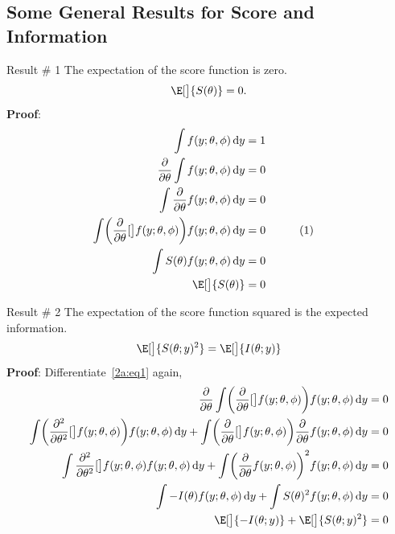 \documentclass[oneside]{book}\usepackage[]{graphicx}\usepackage[svgnames]{xcolor}
\let\log\relax%
\begin{document}
\subsection*{Some General Results for Score and Information}
\begin{Result}{Result \# 1}
      The expectation of the score function is zero.
      \[ \E[\big]{S(\theta)}=0. \]
      \tcblower{}
      \textbf{Proof}:
      \begin{align*}
            \int f(y;\theta,\phi)\odif{y}                                                         & =1                               \\
            \pdv*{\int f(y;\theta,\phi)\odif{y}}{\theta}                                          & =0                               \\
            \int\pdv*{f(y;\theta,\phi)}{\theta} \odif{y}                                          & =0                               \\
            \int\biggl(\pdv*{\log[\big]{f(y;\theta,\phi)}}{\theta}\biggr)f(y;\theta,\phi)\odif{y} & =0 &  & \label{2a:eq1}\tag*{(1)} \\
            \int S(\theta)f(y;\theta,\phi)\odif{y}                                                & =0                               \\
            \E[\big]{S(\theta)}                                                                   & =0
      \end{align*}
\end{Result}
\begin{Result}{Result \# 2}
      The expectation of the score function squared is the expected information.
      \[  \E[\big]{S(\theta;y)^2}=\E[\big]{I(\theta;y)} \]
      \tcblower{}
      \textbf{Proof}: Differentiate~\ref{2a:eq1} again,
      \begin{align*}
            \pdv*{\int\biggl(\pdv*{\log[\big]{f(y;\theta,\phi)}}{\theta}\biggr)f(y;\theta,\phi)\odif{y}}{\theta}                                                                                                 & =0 \\
            \int \biggl(\pdv*[order=2]{\log[\big]{f(y;\theta,\phi)}}{\theta}\biggr)f(y;\theta,\phi)\odif{y}+\int\biggl(\pdv*{\log[\big]{f(y;\theta,\phi)}}{\theta}\biggr)\pdv*{f(y;\theta,\phi)}{\theta}\odif{y} & =0 \\
            \int \pdv*[order=2]{\log[\big]{f(y;\theta,\phi)}}{\theta}f(y;\theta,\phi)\odif{y}+\int\biggl(\pdv*{f(y;\theta,\phi)}{\theta}\biggr)^2 f(y;\theta,\phi)\odif{y}                                       & =0 \\
            \int -I(\theta)f(y;\theta,\phi)\odif{y}+\int S(\theta)^2 f(y;\theta,\phi)\odif{y}                                                                                                                    & =0 \\
            \E[\big]{-I(\theta;y)}+\E[\big]{S(\theta;y)^2}                                                                                                                                                       & =0
      \end{align*}
\end{Result}
\end{document}
